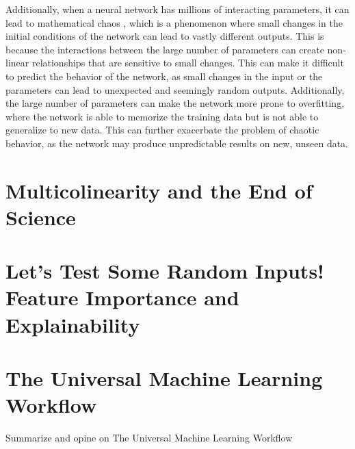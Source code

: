Additionally, when a neural network has millions of interacting parameters, it can lead to mathematical chaos , which is a phenomenon where small changes in the initial conditions of the network can lead to vastly different outputs. This is because the interactions between the large number of parameters can create non-linear relationships that are sensitive to small changes. This can make it difficult to predict the behavior of the network, as small changes in the input or the parameters can lead to unexpected and seemingly random outputs. Additionally, the large number of parameters can make the network more prone to overfitting, where the network is able to memorize the training data but is not able to generalize to new data. This can further exacerbate the problem of chaotic behavior, as the network may produce unpredictable results on new, unseen data.

\section{Multicolinearity and the End of Science}

\section{Let's Test Some Random Inputs! Feature Importance and Explainability}

\section{The Universal Machine Learning Workflow}

Summarize and opine on The Universal Machine Learning Workflow 
